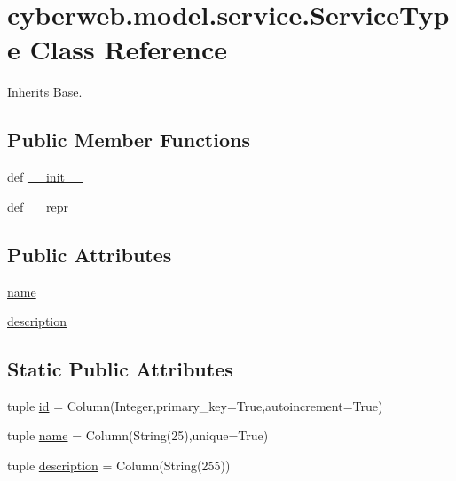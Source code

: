 \hypertarget{classcyberweb_1_1model_1_1service_1_1_service_type}{\section{cyberweb.\-model.\-service.\-Service\-Type \-Class \-Reference}
\label{classcyberweb_1_1model_1_1service_1_1_service_type}
}


\-Inherits \-Base.

\subsection*{\-Public \-Member \-Functions}
\begin{DoxyCompactItemize}
\item 
def \hyperlink{classcyberweb_1_1model_1_1service_1_1_service_type_ab40bc9a853028a5c37bb44aa63ca285c}{\-\_\-\-\_\-init\-\_\-\-\_\-}
\item 
def \hyperlink{classcyberweb_1_1model_1_1service_1_1_service_type_a9db742622ec09df7ddbb384b52df7e80}{\-\_\-\-\_\-repr\-\_\-\-\_\-}
\end{DoxyCompactItemize}
\subsection*{\-Public \-Attributes}
\begin{DoxyCompactItemize}
\item 
\hyperlink{classcyberweb_1_1model_1_1service_1_1_service_type_aba742321d14edfe63b555ad7af5563cb}{name}
\item 
\hyperlink{classcyberweb_1_1model_1_1service_1_1_service_type_a6adebdc21002bc89831a95483d8257aa}{description}
\end{DoxyCompactItemize}
\subsection*{\-Static \-Public \-Attributes}
\begin{DoxyCompactItemize}
\item 
tuple \hyperlink{classcyberweb_1_1model_1_1service_1_1_service_type_a7e5eaee2282f83b6b24c11e72b52ad8a}{id} = \-Column(\-Integer,primary\-\_\-key=\-True,autoincrement=\-True)
\item 
tuple \hyperlink{classcyberweb_1_1model_1_1service_1_1_service_type_a670d3a6a191b20cbcfb869bc2e74ec18}{name} = \-Column(\-String(25),unique=\-True)
\item 
tuple \hyperlink{classcyberweb_1_1model_1_1service_1_1_service_type_a2f03b6e3682babc01fe939891cf91626}{description} = \-Column(\-String(255))
\end{DoxyCompactItemize}


